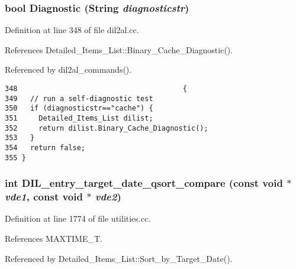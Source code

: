 \subsubsection{\setlength{\rightskip}{0pt plus 5cm}bool Diagnostic ({\bf String} {\em diagnosticstr})}\label{dil2al_8hh_a211}




Definition at line 348 of file dil2al.cc.

References Detailed\_\-Items\_\-List::Binary\_\-Cache\_\-Diagnostic().

Referenced by dil2al\_\-commands().



\footnotesize\begin{verbatim}348                                       {
349   // run a self-diagnostic test
350   if (diagnosticstr=="cache") {
351     Detailed_Items_List dilist;
352     return dilist.Binary_Cache_Diagnostic();
353   }
354   return false;
355 }
\end{verbatim}\normalsize 
{}
\subsubsection{\setlength{\rightskip}{0pt plus 5cm}int DIL\_\-entry\_\-target\_\-date\_\-qsort\_\-compare (const void $\ast$ {\em vde1}, const void $\ast$ {\em vde2})}\label{dil2al_8hh_a212}




Definition at line 1774 of file utilities.cc.

References MAXTIME\_\-T.

Referenced by Detailed\_\-Items\_\-List::Sort\_\-by\_\-Target\_\-Date().




